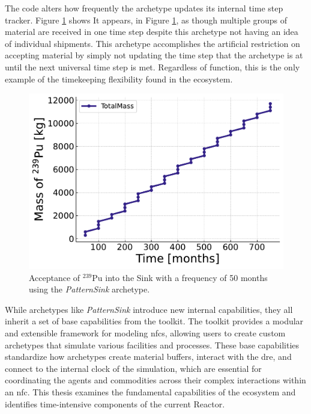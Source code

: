 The code alters how frequently the archetype updates its internal time step tracker. Figure \ref{fig:pattern_freq_50} shows  It appears, in Figure \ref{fig:pattern_freq_50}, as though multiple groups of material are received in one time step despite this archetype not having an idea of individual shipments. This archetype accomplishes the artificial restriction on accepting material by simply not updating the time step that the archetype is at until the next universal time step is met. Regardless of function, this is the only example of the timekeeping flexibility found in the ecosystem.

\begin{figure}[H]
    \centering
    \includegraphics[scale=0.7]{images/cyclus/pattern_sink_fuel_transactions.pdf}
    \caption{Acceptance of $^{239}$Pu into the Sink with a frequency of 50 months using the \textit{PatternSink} archetype.}
    \label{fig:pattern_freq_50}
\end{figure}

While archetypes like \textit{PatternSink} introduce new internal capabilities, they all inherit a set of base capabilities from the \cyclus toolkit. The \cyclus toolkit provides a modular and extensible framework for modeling \glspl{nfc}, allowing users to create custom archetypes that simulate various facilities and processes. These base capabilities standardize how archetypes create material buffers, interact with the \gls{dre}, and connect to the internal clock of the simulation, which are essential for coordinating the agents and commodities across their complex interactions within an \gls{nfc}. This thesis examines the fundamental capabilities of the \cyclus ecosystem and identifies time-intensive components of the current \cycamore Reactor. %

